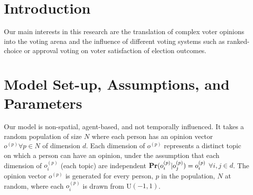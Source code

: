 \section{Introduction}
\label{sec:intro}
Our main interests in this research are the translation of complex voter opinions into the voting arena and the influence of different voting systems such as ranked-choice or approval voting on voter satisfaction of election outcomes.



\section{Model Set-up, Assumptions, and Parameters}
\label{sec:model_setup}
Our model is non-spatial, agent-based, and not temporally influenced.
It takes a random population of size $N$ where each person has an opinion vector $o^{(p)} \forall p \in N$ of dimension $d$.
Each dimension of $o^{(p)}$ represents a distinct topic on which a person can have an opinion, under the assumption that each dimension of $o^{(p)}_i$ (each topic) are independent $\text{\bf Pr}(o^{(p)}_i | o^{(p)}_j) = o^{(p)}_i $  $\forall i,j \in d$.
The opinion vector $o^{(p)}$ is generated for every person, $p$ in the population, $N$ at random, where each $o^{(p)}_i$ is drawn from U$(-1,1)$.

